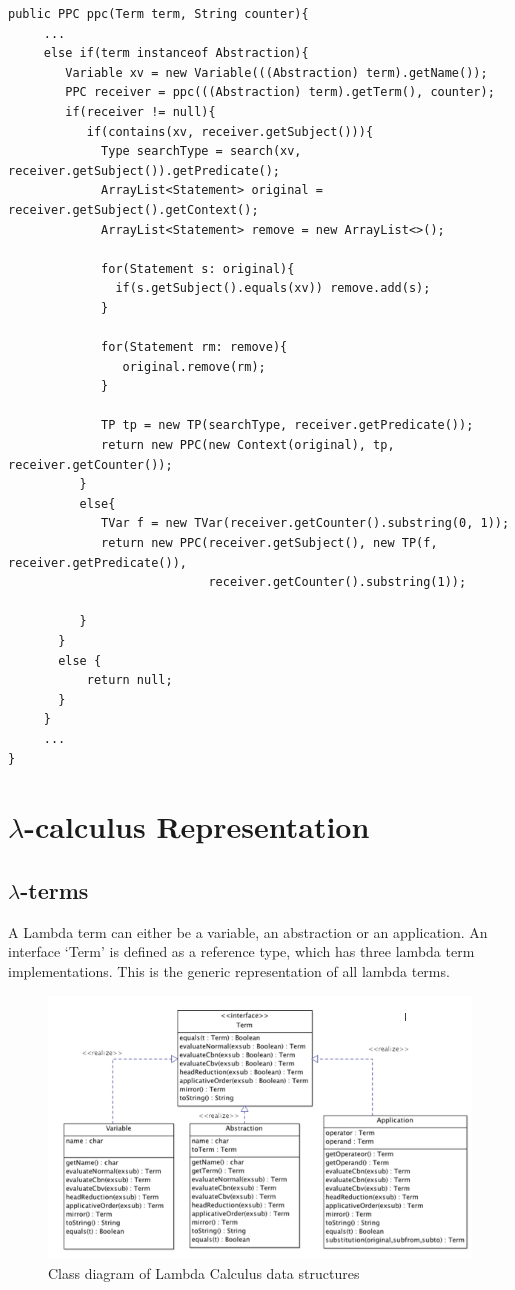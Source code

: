 \begin{verbatim}
public PPC ppc(Term term, String counter){
     ...
     else if(term instanceof Abstraction){
        Variable xv = new Variable(((Abstraction) term).getName());
        PPC receiver = ppc(((Abstraction) term).getTerm(), counter);
        if(receiver != null){
           if(contains(xv, receiver.getSubject())){
             Type searchType = search(xv, receiver.getSubject()).getPredicate();
             ArrayList<Statement> original = receiver.getSubject().getContext();
             ArrayList<Statement> remove = new ArrayList<>();

             for(Statement s: original){
               if(s.getSubject().equals(xv)) remove.add(s);
             }

             for(Statement rm: remove){
                original.remove(rm);
             }

             TP tp = new TP(searchType, receiver.getPredicate());
             return new PPC(new Context(original), tp, receiver.getCounter());
          }
          else{
             TVar f = new TVar(receiver.getCounter().substring(0, 1));
             return new PPC(receiver.getSubject(), new TP(f, receiver.getPredicate()),
                            receiver.getCounter().substring(1));

          }
       }
       else {
           return null;
       }
     }
     ...
}
\end{verbatim}

\section{$\lambda$-calculus Representation}
\subsection{$\lambda$-terms}
A Lambda term can either be a variable, an abstraction or an application. An interface `Term' is defined as a reference type, which has three lambda term implementations. This is the generic representation of all lambda terms.

\begin{figure}[ht]
\centering
\includegraphics[scale=0.7]{pics/Term}
\caption{Class diagram of Lambda Calculus data structures}
\label{fig:term1}
\end{figure}

